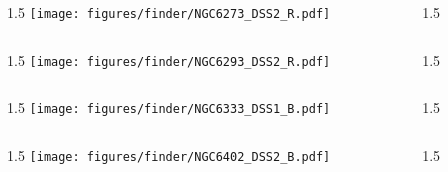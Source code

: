 \documentclass[final]{beamer}
\newlength{\colwidth}
\begin{document}

\begin{frame}[t]{}
    \begin{columns}[T]
        \begin{column}{1.5\colwidth}
            \centering
            \texttt{[image: figures/finder/NGC6273\_DSS2\_R.pdf]}
        \end{column}
        \begin{column}{1.5\colwidth}
            \Large
            
        \end{column}
    \end{columns}
    \vspace{\fill}
    \begin{columns}[T]
        \begin{column}{1.5\colwidth}
            \centering
            \texttt{[image: figures/finder/NGC6293\_DSS2\_R.pdf]}
        \end{column}
        \begin{column}{1.5\colwidth}
            \Large
            
        \end{column}
    \end{columns}
\end{frame}


\begin{frame}[t]{}
    \begin{columns}[T]
        \begin{column}{1.5\colwidth}
            \centering
            \texttt{[image: figures/finder/NGC6333\_DSS1\_B.pdf]}
        \end{column}
        \begin{column}{1.5\colwidth}
            \Large
            
        \end{column}
    \end{columns}
    \vspace{\fill}
    \begin{columns}[T]
        \begin{column}{1.5\colwidth}
            \centering
            \texttt{[image: figures/finder/NGC6402\_DSS2\_B.pdf]}
        \end{column}
        \begin{column}{1.5\colwidth}
            \Large
            
        \end{column}
    \end{columns}
\end{frame}
\end{document}
